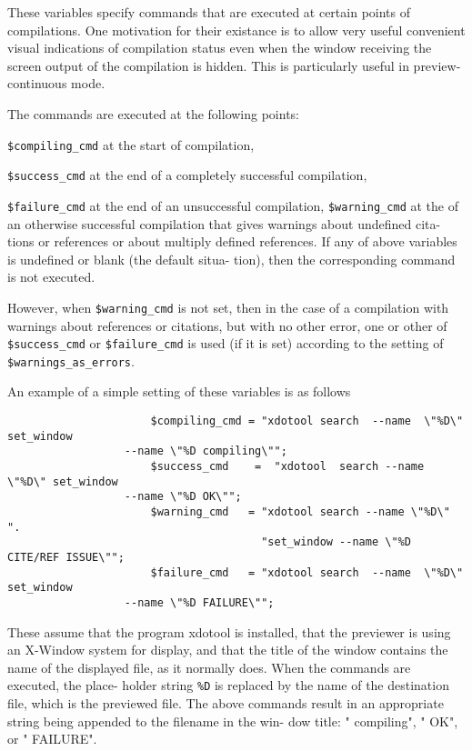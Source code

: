 These variables specify commands that are  executed  at  certain points  of
compilations.  One motivation for their existance is to allow very useful
convenient visual indications  of  compilation  status even when the window
receiving the screen output of the compilation is hidden.  This is particularly
useful in  preview-continuous mode.

The  commands  are  executed  at  the following points: 

\verb|$compiling_cmd| at the start of compilation, 

\verb|$success_cmd| at the end  of
a  completely successful compilation, 

\verb|$failure_cmd| at the end of
an unsuccessful compilation, \verb|$warning_cmd| at the of an otherwise
successful compilation that gives warnings about undefined cita-
tions or references or about multiply defined references. If any
of  above  variables  is  undefined or blank (the default situa-
tion), then the corresponding command is not executed.

However, when \verb|$warning_cmd| is not set, then in  the  case  of  a
compilation  with  warnings  about  references or citations, but
with no other error, one or  other  of  \verb|$success_cmd|  or  \verb|$failure_cmd|  
is  used  (if  it  is  set) according to the setting of
\verb|$warnings_as_errors|.

An example of a simple setting of these variables is as follows

\begin{verbatim}
	                  $compiling_cmd = "xdotool search  --name  \"%D\"  set_window
	              --name \"%D compiling\"";
	                  $success_cmd    =  "xdotool  search --name \"%D\" set_window
	              --name \"%D OK\"";
	                  $warning_cmd   = "xdotool search --name \"%D\" ".
	                                   "set_window --name \"%D CITE/REF ISSUE\"";
	                  $failure_cmd   = "xdotool search  --name  \"%D\"  set_window
	              --name \"%D FAILURE\"";
\end{verbatim}

These  assume  that  the  program xdotool is installed, that the
previewer is using an X-Window system for display, and that  the
title  of the window contains the name of the displayed file, as
it normally does.  When the commands are  executed,  the  place-
holder  string  \verb|%D|  is  replaced  by the name of the destination
file, which is the previewed file.  The above commands result in
an appropriate string being appended to the filename in the win-
dow title: " compiling", " OK", or " FAILURE".

